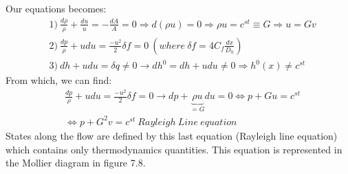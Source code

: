 Our equations becomes:
 \begin{equation}
\begin{aligned}
&1)\ \frac{d\rho}{\rho}+\frac{du}{u}=-\frac{dA}{A}=0 \Rightarrow d(\rho u)=0 \Rightarrow \rho u=c^{st} \equiv G \Rightarrow u=Gv \\
&2)\ \frac{dp}{\rho}+udu=\frac{-u^2}{2} \delta f=0 \ (where \ \delta f =4C_f\frac{dx}{D_h} ) \\
&3)\ dh+udu=\delta q \neq 0 \rightarrow dh^0=dh+udu \neq 0 \Rightarrow h^0(x) \neq c^{st}
\end{aligned} 
\end{equation}
From which, we can find:
 \begin{equation}
\begin{aligned}
&\frac{dp}{\rho}+udu=\frac{-u^2}{2} \delta f=0 \rightarrow dp+\underbrace{\rho u}_{=G}du=0  \Leftrightarrow p+Gu=c^{st} \\ 
&\Leftrightarrow p+G^2v=c^{st} \ Rayleigh\ Line\ equation
\end{aligned} 
\end{equation}
States along the flow are defined by this last equation (Rayleigh line equation) which contains only thermodynamics quantities. This equation is represented in the Mollier diagram in figure 7.8.

